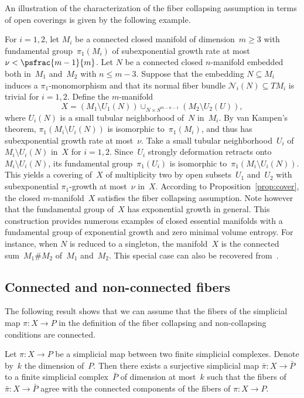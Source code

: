 An illustration of the characterization of the fiber collapsing assumption in terms of open coverings is given by the following example.

\begin{example}
For $i=1,2$, let $M_i$ be a connected closed manifold of dimension~$m \geq 3$ with fundamental group~$\pi_1(M_i)$ of subexponential growth rate at most~$\nu < \psfrac{m-1}{m}$.
Let $N$ be a connected closed $n$-manifold embedded both in~$M_1$ and~$M_2$ with $n \leq m-3$.
Suppose that the embedding $N \subseteq M_i$ induces a $\pi_1$-monomorphism and that its normal fiber bundle $\mathcal{N}_i(N) \subseteq TM_i$ is trivial for $i=1,2$.
Define the $m$\nobreakdash-manifold
\[
X = (M_1 \setminus U_1(N)) \mathop{\cup}_{N \times S^{m-n-1}} (M_2 \setminus U_2(U)),
\]
where $U_i(N)$ is a small tubular neighborhood of~$N$ in~$M_i$.
By van Kampen's theorem, $\pi_1(M_i \setminus U_i(N))$ is isomorphic to~$\pi_1(M_i)$, and thus has subexponential growth rate at most~$\nu$.
Take a small tubular neighborhood~$U_i$ of~$M_i \setminus U_i(N)$ in~$X$ for $i=1,2$.
Since~$U_i$ strongly deformation retracts onto~$M_i \setminus U_i(N)$, its fundamental group~$\pi_1(U_i)$ is isomorphic to~$\pi_1(M_i \setminus U_i(N))$.
This yields a covering of~$X$ of multiplicity two by open subsets~$U_1$ and~$U_2$ with subexponential $\pi_1$-growth at most~$\nu$ in~$X$.
According to Proposition~\ref{prop:cover}, the closed $m$\nobreakdash-manifold~$X$ satisfies the fiber collapsing assumption.
Note however that the fundamental group of~$X$ has exponential growth in general.
This construction provides numerous examples of closed essential manifolds with a fundamental group of exponential growth and zero minimal volume entropy.
For instance, when $N$ is reduced to a singleton, the manifold~$X$ is the connected sum~$M_1 \# M_2$ of~$M_1$ and~$M_2$.
This special case can also be recovered from~\cite[Th.\,2.8]{BS}.
\end{example}

\subsection{Connected and non-connected fibers}

The following result shows that we can assume that the fibers of the simplicial map $\pi:X \to P$ in the definition of the fiber collapsing and non-collapsing conditions are connected.

\begin{proposition} \label{prop:connected}
Let $\pi:X \to P$ be a simplicial map between two finite simplicial complexes.
Denote by~$k$ the dimension of~$P$.
Then there exists a surjective simplicial map $\bar{\pi}:X \to \bar{P}$ to a finite simplicial complex~$\bar{P}$ of dimension at most~$k$ such that the fibers of $\bar{\pi}:X \to \bar{P}$ agree with the connected components of the fibers of $\pi:X \to P$.
\end{proposition}

